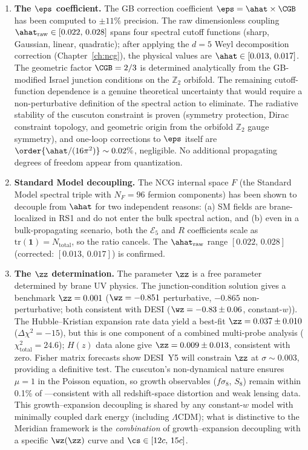 \begin{enumerate}
\item \textbf{The $\eps$ coefficient.} The GB correction coefficient $\eps = \ahat \times \CGB$ has been computed to ${\pm}11\%$ precision. The raw dimensionless coupling $\ahat_{\mathrm{raw}} \in [0.022,\, 0.028]$ spans four spectral cutoff functions (sharp, Gaussian, linear, quadratic); after applying the $d = 5$ Weyl decomposition correction (Chapter~\ref{ch:ncg}), the physical values are $\ahat \in [0.013,\, 0.017]$. The geometric factor $\CGB = 2/3$ is determined analytically from the GB-modified Israel junction conditions on the $\mathbb{Z}_2$ orbifold. The remaining cutoff-function dependence is a genuine theoretical uncertainty that would require a non-perturbative definition of the spectral action to eliminate. The radiative stability of the cuscuton constraint is proven (symmetry protection, Dirac constraint topology, and geometric origin from the orbifold $\mathbb{Z}_2$ gauge symmetry), and one-loop corrections to $\eps$ itself are $\order{\ahat/(16\pi^2)} \sim 0.02\%$, negligible. No additional propagating degrees of freedom appear from quantization.

\item \textbf{Standard Model decoupling.} The NCG internal space $F$ (the Standard Model spectral triple with $N_F = 96$ fermion components) has been shown to decouple from $\ahat$ for two independent reasons: (a) SM fields are brane-localized in RS1 and do not enter the bulk spectral action, and (b) even in a bulk-propagating scenario, both the $\mathcal{E}_5$ and $R$ coefficients scale as $\mathrm{tr}(\mathbf{1}) = N_{\mathrm{total}}$, so the ratio cancels. The $\ahat_{\mathrm{raw}}$ range $[0.022,\, 0.028]$ (corrected: $[0.013,\, 0.017]$) is confirmed.

\item \textbf{The $\zz$ determination.} The parameter $\zz$ is a free parameter determined by brane UV physics. The junction-condition solution gives a benchmark $\zz = 0.001$ ($\wz = -0.851$ perturbative, $-0.865$ non-perturbative; both consistent with DESI ($\wz = -0.83 \pm 0.06$, constant-$w$)). The Hubble--Kristian expansion rate data yield a best-fit $\zz = 0.037 \pm 0.010$ ($\Delta\chi^2 = -15$), but this is one component of a combined multi-probe analysis ($\chi^2_{\mathrm{total}} = 24.6$); $H(z)$ data alone give $\zz = 0.009 \pm 0.013$, consistent with zero. Fisher matrix forecasts show DESI~Y5 will constrain $\zz$ at $\sigma \sim 0.003$, providing a definitive test. The cuscuton's non-dynamical nature ensures $\mu = 1$ in the Poisson equation, so growth observables ($f\sigma_8$, $S_8$) remain within 0.1\% of \LCDM---consistent with all redshift-space distortion and weak lensing data. This growth--expansion decoupling is shared by any constant-$w$ model with minimally coupled dark energy (including $\Lambda$CDM); what is distinctive to the Meridian framework is the \emph{combination} of growth--expansion decoupling with a specific $\wz(\zz)$ curve and $\cs \in [12c,\, 15c]$.


\end{enumerate}
